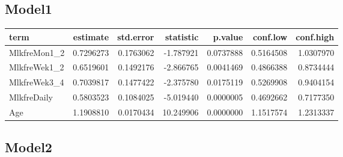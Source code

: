 \documentclass[]{article}
\newenvironment{Shaded}{\begin{snugshade}}{\end{snugshade}}
\newcommand{\DataTypeTok}[1]{\textcolor[rgb]{0.13,0.29,0.53}{#1}}
\newcommand{\KeywordTok}[1]{\textcolor[rgb]{0.13,0.29,0.53}{\textbf{#1}}}
\newcommand{\NormalTok}[1]{#1}
\newcommand{\OperatorTok}[1]{\textcolor[rgb]{0.81,0.36,0.00}{\textbf{#1}}}
\newcommand{\OtherTok}[1]{\textcolor[rgb]{0.56,0.35,0.01}{#1}}
\newcommand{\StringTok}[1]{\textcolor[rgb]{0.31,0.60,0.02}{#1}}
\begin{document}
\hypertarget{model1-4}{%
\subsection{Model1}\label{model1-4}}

\begin{Shaded}
\end{Shaded}

\begin{longtable}[]{@{}lrrrrrr@{}}
\toprule
term & estimate & std.error & statistic & p.value & conf.low &
conf.high\tabularnewline
\midrule
\endhead
MlkfreMon1\_2 & 0.7296273 & 0.1763062 & -1.787921 & 0.0737888 &
0.5164508 & 1.0307970\tabularnewline
MlkfreWek1\_2 & 0.6519601 & 0.1492176 & -2.866765 & 0.0041469 &
0.4866388 & 0.8734444\tabularnewline
MlkfreWek3\_4 & 0.7039817 & 0.1477422 & -2.375780 & 0.0175119 &
0.5269908 & 0.9404154\tabularnewline
MlkfreDaily & 0.5803523 & 0.1084025 & -5.019440 & 0.0000005 & 0.4692662
& 0.7177350\tabularnewline
Age & 1.1908810 & 0.0170434 & 10.249906 & 0.0000000 & 1.1517574 &
1.2313337\tabularnewline
\bottomrule
\end{longtable}

\hypertarget{model2-4}{%
\subsection{Model2}\label{model2-4}}
\end{document}
